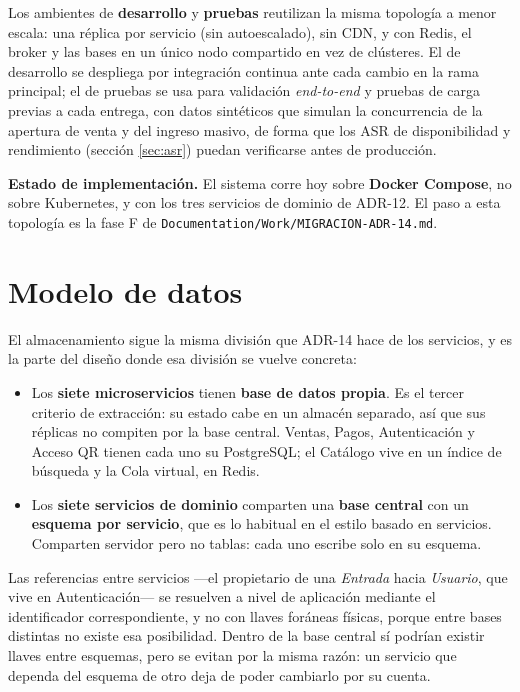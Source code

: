 Los ambientes de \textbf{desarrollo} y \textbf{pruebas} reutilizan la misma topología a menor
escala: una réplica por servicio (sin autoescalado), sin CDN, y con Redis, el broker y las bases en
un único nodo compartido en vez de clústeres. El de desarrollo se despliega por integración continua
ante cada cambio en la rama principal; el de pruebas se usa para validación \textit{end-to-end} y
pruebas de carga previas a cada entrega, con datos sintéticos que simulan la concurrencia de la
apertura de venta y del ingreso masivo, de forma que los ASR de disponibilidad y rendimiento
(sección \ref{sec:asr}) puedan verificarse antes de producción.

\medskip
\noindent\textbf{Estado de implementación.} El sistema corre hoy sobre \textbf{Docker Compose}, no
sobre Kubernetes, y con los tres servicios de dominio de ADR-12. El paso a esta topología es la
fase F de \texttt{Documentation/Work/MIGRACION-ADR-14.md}.

\section{Modelo de datos}
\label{sec:datos}

El almacenamiento sigue la misma división que ADR-14 hace de los servicios, y es la parte del diseño
donde esa división se vuelve concreta:

\begin{itemize}
\item Los \textbf{siete microservicios} tienen \textbf{base de datos propia}. Es el tercer criterio
      de extracción: su estado cabe en un almacén separado, así que sus réplicas no compiten por la
      base central. Ventas, Pagos, Autenticación y Acceso QR tienen cada uno su PostgreSQL; el
      Catálogo vive en un índice de búsqueda y la Cola virtual, en Redis.
\item Los \textbf{siete servicios de dominio} comparten una \textbf{base central} con un
      \textbf{esquema por servicio}, que es lo habitual en el estilo basado en servicios. Comparten
      servidor pero no tablas: cada uno escribe solo en su esquema.
\end{itemize}

Las referencias entre servicios ---el propietario de una \textit{Entrada} hacia \textit{Usuario},
que vive en Autenticación--- se resuelven a nivel de aplicación mediante el identificador
correspondiente, y no con llaves foráneas físicas, porque entre bases distintas no existe esa
posibilidad. Dentro de la base central sí podrían existir llaves entre esquemas, pero se evitan por
la misma razón: un servicio que dependa del esquema de otro deja de poder cambiarlo por su cuenta.

